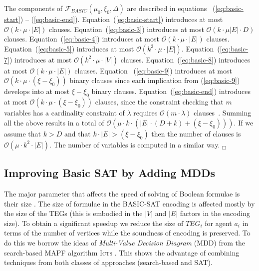 \documentclass[jair,oneside,11pt]{article}
\begin{document}
 The components of $\mathcal{F}_{BASIC}(\mu_0,\xi_0, \Delta)$ are described in equations~ (\ref{eq:basic-start}) -- (\ref{eq:basic-end}). Equation~(\ref{eq:basic-start}) introduces at most $\mathcal{O}(k\cdot \mu \cdot |E| )$ clauses. Equation~(\ref{eq:basic-3}) introduces at most $\mathcal{O}(k\cdot \mu |E| \cdot D)$ clauses. Equation~(\ref{eq:basic-4}) introduces at most $\mathcal{O}(k \cdot \mu \cdot |E|)$ clauses. Equation~(\ref{eq:basic-5}) introduces at most $\mathcal{O}(k^2\cdot \mu \cdot |E|)$.
Equation~(\ref{eq:basic-7}) introduces at most $\mathcal{O}(k^2\cdot \mu \cdot |V|)$ clauses. Equation~(\ref{eq:basic-8}) introduces at most $\mathcal{O}(k\cdot \mu \cdot |E|)$ clauses. Equation ~(\ref{eq:basic-9}) introduces at most $\mathcal{O}(k \cdot \mu \cdot (\xi-\xi_0))$ binary clauses since each implication from (\ref{eq:basic-9}) develops into at most $\xi-\xi_0$ binary clauses. Equation~(\ref{eq:basic-end}) introduces at most $\mathcal{O}(k\cdot \mu \cdot (\xi-\xi_0))$ clauses, since the constraint checking that $m$ variables has a cardinality constraint of $\lambda$ requires $\mathcal{O}(m\cdot \lambda)$ clauses~\cite{DBLP:conf/cp/Sinz05}. Summing all the above results in a total of $\mathcal{O}(\mu \cdot k\cdot (|E| \cdot (D+k) + (\xi-\xi_0)))$. If we assume that $k>D$ and that $k \cdot|E|> (\xi-\xi_0)$ then the number of clauses is $\mathcal{O}(\mu \cdot k^2\cdot |E|)$. The number of variables is computed in a similar way. $_\Box$


\subsection{Improving Basic SAT by Adding MDDs}

\noindent The major parameter that affects the speed of solving of Boolean formulae is their size \cite{DBLP:books/sp/Petke15}. The size of formulae in the BASIC-SAT encoding is affected mostly by the size of the TEGs (this is embodied in the $|V|$ and $|E|$ factors in the encoding size). To obtain a significant speedup we reduce the size of $TEG_i$ for agent $a_i$ in terms of the number of vertices while the soundness of encoding is preserved. To do this we borrow the ideas of {\em Multi-Value Decision Diagram} (MDD) \cite{DBLP:conf/cp/AndersenHHT07} from the search-based MAPF algorithm \textsc{Icts} \cite{DBLP:journals/ai/SharonSGF13}. This shows the advantage of combining techniques from both classes of approaches (search-based and SAT).
\end{document}
